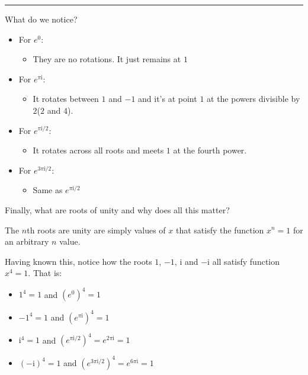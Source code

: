 \documentclass[11pt]{article}
\providecommand{\tightlist}{%
      \setlength{\itemsep}{0pt}\setlength{\parskip}{0pt}}
\begin{document}
    \begin{center}\rule{0.5\linewidth}{0.5pt}\end{center}

    What do we notice?

\begin{itemize}
\tightlist
\item
  For \(e^0\):

  \begin{itemize}
  \tightlist
  \item
    They are no rotations. It just remains at \(1\)
  \end{itemize}
\item
  For \(e^{\pi\mathrm{i}}\):

  \begin{itemize}
  \tightlist
  \item
    It rotates between \(1\) and \(-1\) and it's at point \(1\) at the
    powers divisible by \(2\)(\(2\) and \(4\)).
  \end{itemize}
\item
  For \(e^{\pi\mathrm{i}/{2}}\):

  \begin{itemize}
  \tightlist
  \item
    It rotates across all roots and meets \(1\) at the fourth power.
  \end{itemize}
\item
  For \(e^{3\pi\mathrm{i}/{2}}\):

  \begin{itemize}
  \tightlist
  \item
    Same as \(e^{\pi\mathrm{i}/{2}}\)
  \end{itemize}
\end{itemize}

Finally, what are roots of unity and why does all this matter?

The \(n\)th roots are unity are simply values of \(x\) that satisfy the
function \(x^n = 1\) for an arbitrary \(n\) value.

Having known this, notice how the roots \(1\), \(-1\), \(\mathrm{i}\)
and \(-\mathrm{i}\) all satisfy function \(x^4 = 1\). That is:

\begin{itemize}
\tightlist
\item
  \(1^4 = 1\) and \((e^0)^4 = 1\)
\item
  \(-1^4 = 1\) and \((e^{\pi\mathrm{i}})^4 = 1\)
\item
  \(\mathrm{i}^4 = 1\) and
  \((e^{\pi\mathrm{i}/{2}})^4 = e^{2\pi\mathrm{i}} = 1\)
\item
  \((-\mathrm{i})^4 = 1\) and
  \((e^{3\pi\mathrm{i}/{2}})^4 = e^{6\pi\mathrm{i}} = 1\)
\end{itemize}
\end{document}

